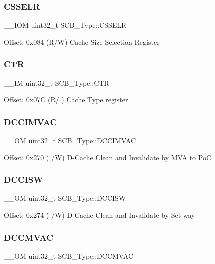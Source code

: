 \subsubsection{\texorpdfstring{CSSELR}{CSSELR}}
{\footnotesize\ttfamily \+\_\+\+\_\+\+I\+OM uint32\+\_\+t S\+C\+B\+\_\+\+Type\+::\+C\+S\+S\+E\+LR}

Offset\+: 0x084 (R/W) Cache Size Selection Register \mbox{\label{struct_s_c_b___type_af3fe705fef8762763b6d61dbdf0ccc3d}} 
\subsubsection{\texorpdfstring{CTR}{CTR}}
{\footnotesize\ttfamily \+\_\+\+\_\+\+IM uint32\+\_\+t S\+C\+B\+\_\+\+Type\+::\+C\+TR}

Offset\+: 0x07C (R/ ) Cache Type register \mbox{\label{struct_s_c_b___type_a4f59813582b53feb5f1afbbad3db2022}} 
\subsubsection{\texorpdfstring{DCCIMVAC}{DCCIMVAC}}
{\footnotesize\ttfamily \+\_\+\+\_\+\+OM uint32\+\_\+t S\+C\+B\+\_\+\+Type\+::\+D\+C\+C\+I\+M\+V\+AC}

Offset\+: 0x270 ( /W) D-\/\+Cache Clean and Invalidate by M\+VA to PoC \mbox{\label{struct_s_c_b___type_af50f7a0a9574fe0e24a68bb4eca75140}} 
\subsubsection{\texorpdfstring{DCCISW}{DCCISW}}
{\footnotesize\ttfamily \+\_\+\+\_\+\+OM uint32\+\_\+t S\+C\+B\+\_\+\+Type\+::\+D\+C\+C\+I\+SW}

Offset\+: 0x274 ( /W) D-\/\+Cache Clean and Invalidate by Set-\/way \mbox{\label{struct_s_c_b___type_a042e3622c98de4e908cfda4f70d1f097}} 
\subsubsection{\texorpdfstring{DCCMVAC}{DCCMVAC}}
{\footnotesize\ttfamily \+\_\+\+\_\+\+OM uint32\+\_\+t S\+C\+B\+\_\+\+Type\+::\+D\+C\+C\+M\+V\+AC}

